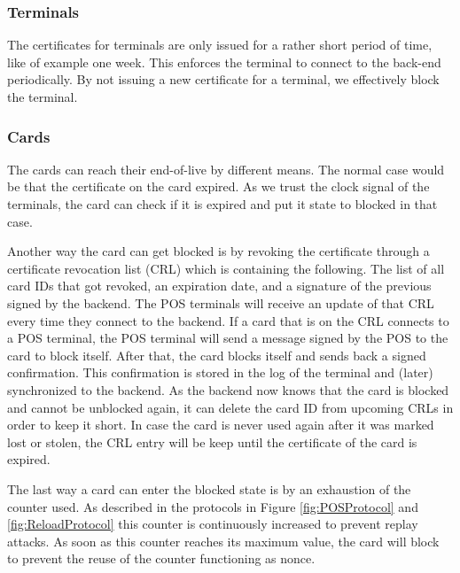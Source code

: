 \subsubsection{Terminals}
The certificates for terminals are only issued for a rather short period of time, like of example one week.
This enforces the terminal to connect to the back-end periodically.
By not issuing a new certificate for a terminal, we effectively block the terminal.

\subsubsection{Cards}
The cards can reach their end-of-live by different means.
The normal case would be that the certificate on the card expired.
As we trust the clock signal of the terminals, the card can check if it is expired and put it state to blocked in that case.

Another way the card can get blocked is by revoking the certificate through a certificate revocation list (CRL) which is containing the following.
The list of all card IDs that got revoked, an expiration date, and a signature of the previous signed by the backend.
The POS terminals will receive an update of that CRL every time they connect to the backend.
If a card that is on the CRL connects to a POS terminal, the POS terminal will send a message signed by the POS to the card to block itself.
After that, the card blocks itself and sends back a signed confirmation.
This confirmation is stored in the log of the terminal and (later) synchronized to the backend.
As the backend now knows that the card is blocked and cannot be unblocked again, it can delete the card ID from upcoming CRLs in order to keep it short.
In case the card is never used again after it was marked lost or stolen, the CRL entry will be keep until the certificate of the card is expired.


The last way a card can enter the blocked state is by an exhaustion of the counter used.
As described in the protocols in Figure \ref{fig:POSProtocol} and \ref{fig:ReloadProtocol} this counter is continuously increased to prevent replay attacks.
As soon as this counter reaches its maximum value, the card will block to prevent the reuse of the counter functioning as nonce.

